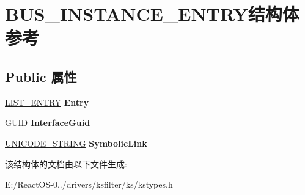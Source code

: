 \hypertarget{struct_b_u_s___i_n_s_t_a_n_c_e___e_n_t_r_y}{}\section{B\+U\+S\+\_\+\+I\+N\+S\+T\+A\+N\+C\+E\+\_\+\+E\+N\+T\+R\+Y结构体 参考}
\label{struct_b_u_s___i_n_s_t_a_n_c_e___e_n_t_r_y}
\subsection*{Public 属性}
\begin{DoxyCompactItemize}
\item 
\mbox{\label{struct_b_u_s___i_n_s_t_a_n_c_e___e_n_t_r_y_adcc87010cc54e2132deb4156ca62c05d}} 
\hyperlink{struct___l_i_s_t___e_n_t_r_y}{L\+I\+S\+T\+\_\+\+E\+N\+T\+RY} {\bfseries Entry}
\item 
\mbox{\label{struct_b_u_s___i_n_s_t_a_n_c_e___e_n_t_r_y_afab630d9730c644950c142ab8cf5ac53}} 
\hyperlink{interface_g_u_i_d}{G\+U\+ID} {\bfseries Interface\+Guid}
\item 
\mbox{\label{struct_b_u_s___i_n_s_t_a_n_c_e___e_n_t_r_y_af72a95f6a6762bcdf6b7c0e66d4e87e4}} 
\hyperlink{struct___u_n_i_c_o_d_e___s_t_r_i_n_g}{U\+N\+I\+C\+O\+D\+E\+\_\+\+S\+T\+R\+I\+NG} {\bfseries Symbolic\+Link}
\end{DoxyCompactItemize}


该结构体的文档由以下文件生成\+:\begin{DoxyCompactItemize}
\item 
E\+:/\+React\+O\+S-\/0../drivers/ksfilter/ks/kstypes.\+h\end{DoxyCompactItemize}
